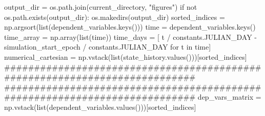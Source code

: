 \markdownRendererInterblockSeparator
{}
\markdownRendererSectionEnd \markdownRendererSectionBegin
{}\markdownRendererInterblockSeparator
{}output_dir = os.path.join(current_directory, "figures") if not os.path.exists(output_dir): os.makedirs(output_dir)\markdownRendererInterblockSeparator
{}
\markdownRendererSectionEnd \markdownRendererSectionBegin
{}\markdownRendererInterblockSeparator
{}
\markdownRendererSectionEnd \markdownRendererSectionBegin
{}\markdownRendererInterblockSeparator
{}sorted_indices = np.argsort(list(dependent_variables.keys()))\markdownRendererInterblockSeparator
{}
\markdownRendererSectionEnd \markdownRendererSectionBegin
{}\markdownRendererInterblockSeparator
{}
\markdownRendererSectionEnd \markdownRendererSectionBegin
{}\markdownRendererInterblockSeparator
{}time = dependent_variables.keys() time_array = np.array(list(time)) time_days = [ t / constants.JULIAN_DAY - simulation_start_epoch / constants.JULIAN_DAY for t in time]\markdownRendererInterblockSeparator
{}
\markdownRendererSectionEnd \markdownRendererSectionBegin
{}\markdownRendererInterblockSeparator
{}numerical_cartesian = np.vstack(list(state_history.values()))[sorted_indices]\markdownRendererInterblockSeparator
{}###########################################################################\markdownRendererInterblockSeparator
{}
\markdownRendererSectionEnd \markdownRendererSectionBegin
{}\markdownRendererInterblockSeparator
{}###########################################################################\markdownRendererInterblockSeparator
{}
\markdownRendererSectionEnd \markdownRendererSectionBegin
{}\markdownRendererInterblockSeparator
{}dep_vars_matrix = np.vstack(list(dependent_variables.values()))[sorted_indices]\markdownRendererInterblockSeparator
{}
\markdownRendererSectionEnd \markdownRendererSectionBegin
{}\markdownRendererInterblockSeparator
